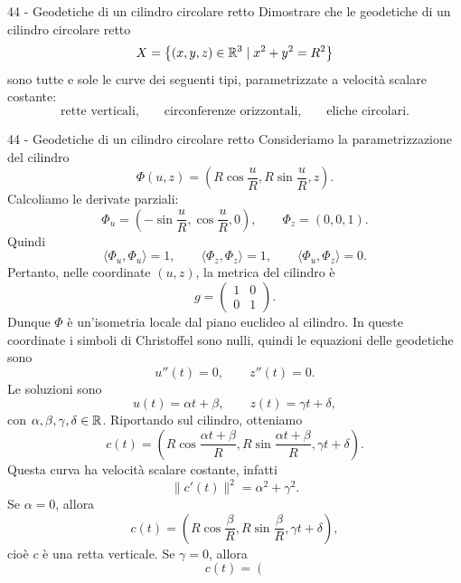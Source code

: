\documentclass[a4paper]{article}
\begin{document}
\begin{snippetexercise}{44 - Geodetiche di un cilindro circolare retto}
    Dimostrare che le geodetiche di un cilindro circolare retto
    \[
        X=\left\{(x,y,z)\in\mathbb{R}^3\mid x^2+y^2=R^2\right\}
    \]
    sono tutte e sole le curve dei seguenti tipi, parametrizzate a
    velocità scalare costante:
    \[
        \text{rette verticali,}
        \qquad
        \text{circonferenze orizzontali,}
        \qquad
        \text{eliche circolari.}
    \]
\end{snippetexercise}

\begin{snippetsolution}{44 - Geodetiche di un cilindro circolare retto}
    Consideriamo la parametrizzazione del cilindro
    \[
        \Phi(u,z)=
        \left(
            R\cos\frac{u}{R},
            R\sin\frac{u}{R},
            z
        \right).
    \]
    Calcoliamo le derivate parziali:
    \[
        \Phi_u=
        \left(
            -\sin\frac{u}{R},
            \cos\frac{u}{R},
            0
        \right),
        \qquad
        \Phi_z=(0,0,1).
    \]
    Quindi
    \[
        \langle \Phi_u,\Phi_u\rangle=1,
        \qquad
        \langle \Phi_z,\Phi_z\rangle=1,
        \qquad
        \langle \Phi_u,\Phi_z\rangle=0.
    \]
    Pertanto, nelle coordinate \((u,z)\), la metrica del cilindro è
    \[
        g=
        \begin{pmatrix}
            1 & 0\\
            0 & 1
        \end{pmatrix}.
    \]
    Dunque \(\Phi\) è un'isometria locale dal piano euclideo al cilindro. In queste coordinate i simboli di Christoffel sono nulli, quindi le equazioni delle geodetiche sono
    \[
        u''(t)=0,
        \qquad
        z''(t)=0.
    \]
    Le soluzioni sono
    \[
        u(t)=\alpha t+\beta,
        \qquad
        z(t)=\gamma t+\delta,
    \]
    con \(\alpha,\beta,\gamma,\delta\in\mathbb{R}\). Riportando sul cilindro, otteniamo
    \[
        c(t)=
        \left(
            R\cos\frac{\alpha t+\beta}{R},
            R\sin\frac{\alpha t+\beta}{R},
            \gamma t+\delta
        \right).
    \]
    Questa curva ha velocità scalare costante, infatti
    \[
        \|c'(t)\|^2=\alpha^2+\gamma^2.
    \]
    Se \(\alpha=0\), allora
    \[
        c(t)=
        \left(
            R\cos\frac{\beta}{R},
            R\sin\frac{\beta}{R},
            \gamma t+\delta
        \right),
    \]
    cioè \(c\) è una retta verticale.
    Se \(\gamma=0\), allora
    \[
        c(t)=
        \left(
\]
\end{snippetsolution}
\end{document}
